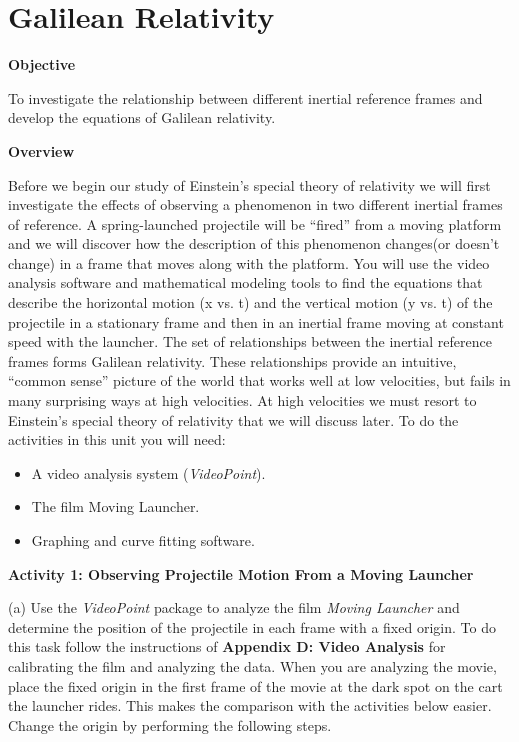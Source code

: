 
\section{Galilean Relativity}

\makelabheader %

\textbf{Objective }

To investigate the relationship between different inertial reference
frames and develop the equations of Galilean relativity.

\textbf{Overview}

Before we begin our study of Einstein's special theory of relativity
we will first investigate the effects of observing a phenomenon in
two different inertial frames of reference. A spring-launched projectile
will be {}``fired'' from a moving platform and we will discover
how the description of this phenomenon changes(or doesn't change)
in a frame that moves along with the platform. You will use the video
analysis software and mathematical modeling tools to find the equations
that describe the horizontal motion (x vs. t) and the vertical motion
(y vs. t) of the projectile in a stationary frame and then in an inertial
frame moving at constant speed with the launcher. The set of relationships
between the inertial reference frames forms Galilean relativity. These
relationships provide an intuitive, {}``common sense'' picture of
the world that works well at low velocities, but fails in many surprising
ways at high velocities. At high velocities we must resort to Einstein's
special theory of relativity that we will discuss later. To do the
activities in this unit you will need:

\begin{itemize}
\item A video analysis system (\emph{VideoPoint}).
\item The film Moving Launcher.
\item Graphing and curve fitting software.
\end{itemize}
\textbf{Activity 1: Observing Projectile Motion From a Moving Launcher}

(a) Use the \emph{VideoPoint} package to analyze the film \emph{Moving
Launcher} and determine the position of the projectile in each frame
with a fixed origin. To do this task follow the instructions of \textbf{Appendix
D: Video Analysis} for calibrating the film and analyzing the data.
When you are analyzing the movie, place the fixed origin in the first
frame of the movie at the dark spot on the cart the launcher rides.
This makes the comparison with the activities below easier. Change
the origin by performing the following steps.

